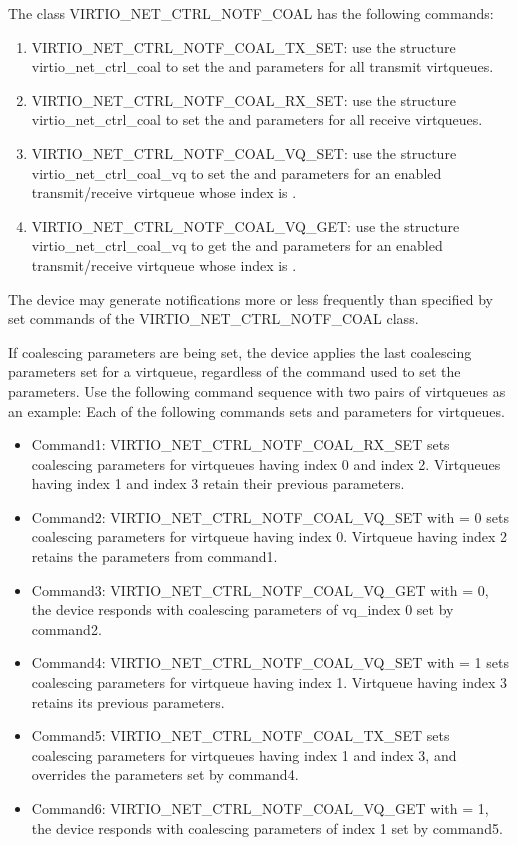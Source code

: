 The class VIRTIO_NET_CTRL_NOTF_COAL has the following commands:
\begin{enumerate}
\item VIRTIO_NET_CTRL_NOTF_COAL_TX_SET: use the structure virtio_net_ctrl_coal to set the  and  parameters for all transmit virtqueues.
\item VIRTIO_NET_CTRL_NOTF_COAL_RX_SET: use the structure virtio_net_ctrl_coal to set the  and  parameters for all receive virtqueues.
\item VIRTIO_NET_CTRL_NOTF_COAL_VQ_SET: use the structure virtio_net_ctrl_coal_vq to set the  and  parameters
                                        for an enabled transmit/receive virtqueue whose index is .
\item VIRTIO_NET_CTRL_NOTF_COAL_VQ_GET: use the structure virtio_net_ctrl_coal_vq to get the  and  parameters
                                        for an enabled transmit/receive virtqueue whose index is .
\end{enumerate}

The device may generate notifications more or less frequently than specified by set commands of the VIRTIO_NET_CTRL_NOTF_COAL class.

If coalescing parameters are being set, the device applies the last coalescing parameters set for a
virtqueue, regardless of the command used to set the parameters. Use the following command sequence
with two pairs of virtqueues as an example:
Each of the following commands sets  and  parameters for virtqueues.
\begin{itemize}
\item Command1: VIRTIO_NET_CTRL_NOTF_COAL_RX_SET sets coalescing parameters for virtqueues having index 0 and index 2. Virtqueues having index 1 and index 3 retain their previous parameters.
\item Command2: VIRTIO_NET_CTRL_NOTF_COAL_VQ_SET with  = 0 sets coalescing parameters for virtqueue having index 0. Virtqueue having index 2 retains the parameters from command1.
\item Command3: VIRTIO_NET_CTRL_NOTF_COAL_VQ_GET with  = 0, the device responds with coalescing parameters of vq_index 0 set by command2.
\item Command4: VIRTIO_NET_CTRL_NOTF_COAL_VQ_SET with  = 1 sets coalescing parameters for virtqueue having index 1. Virtqueue having index 3 retains its previous parameters.
\item Command5: VIRTIO_NET_CTRL_NOTF_COAL_TX_SET sets coalescing parameters for virtqueues having index 1 and index 3, and overrides the parameters set by command4.
\item Command6: VIRTIO_NET_CTRL_NOTF_COAL_VQ_GET with  = 1, the device responds with coalescing parameters of index 1 set by command5.
\end{itemize}

